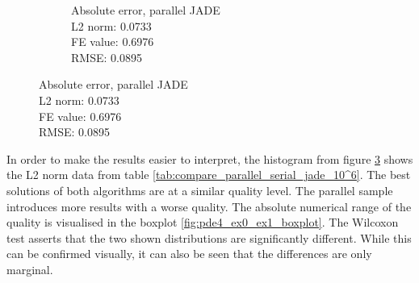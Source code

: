 \documentclass[./\jobname.tex]{subfiles}
\begin{document}
\begin{figure}[H]
\begin{subfigure}[b]{0.5\linewidth}
		\caption{Absolute error, parallel JADE \\ L2 norm: 0.0733 \\ FE value: 0.6976 \\ RMSE: 0.0895}
		\label{fig:parallel_JADE_pde4_abs_error}
	\end{subfigure}%
	\label{fig:serial_parallel_pde4_error_comparison}
\end{figure}


In order to make the results easier to interpret, the histogram from figure \ref{fig:pde4_ex0_ex1_histogram} shows the L2 norm data from table \ref{tab:compare_parallel_serial_jade_10^6}. The best solutions of both algorithms are at a similar quality level. The parallel sample introduces more results with a worse quality. The absolute numerical range of the quality is visualised in the boxplot \ref{fig:pde4_ex0_ex1_boxplot}. The Wilcoxon test asserts that the two shown distributions are significantly different. While this can be confirmed visually, it can also be seen that the differences are only marginal. 


\begin{figure}[H]
	\centering
	\noindent{}
	\label{fig:pde4_ex0_ex1_histogram}
\end{figure}
\end{document}
